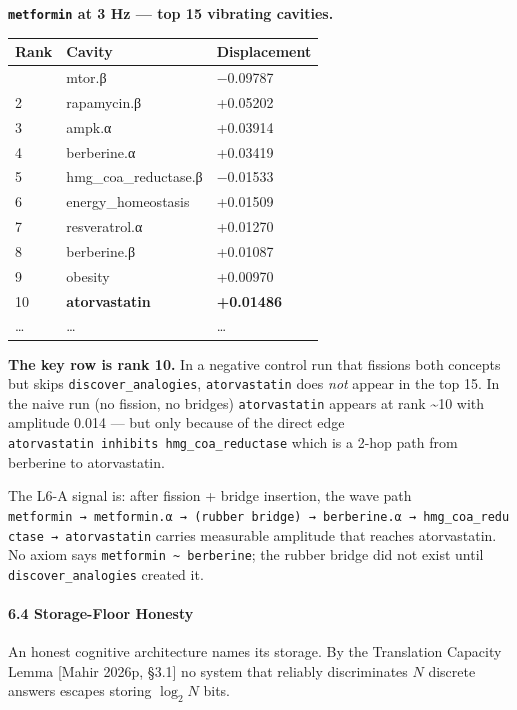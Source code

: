 \documentclass[
  11pt,
  a4paper,
]{article}
\begin{document}
\textbf{\texttt{metformin} at 3 Hz --- top 15 vibrating cavities.}

\begin{longtable}[]{@{}lll@{}}
\toprule\noalign{}
Rank & Cavity & Displacement \\
\midrule\noalign{}
\endhead
\bottomrule\noalign{}
\endlastfoot
1 & mtor.β & −0.09787 \\
2 & rapamycin.β & +0.05202 \\
3 & ampk.α & +0.03914 \\
4 & berberine.α & +0.03419 \\
5 & hmg\_coa\_reductase.β & −0.01533 \\
6 & energy\_homeostasis & +0.01509 \\
7 & resveratrol.α & +0.01270 \\
8 & berberine.β & +0.01087 \\
9 & obesity & +0.00970 \\
10 & \textbf{atorvastatin} & \textbf{+0.01486} \\
\ldots{} & \ldots{} & \ldots{} \\
\end{longtable}

\textbf{The key row is rank 10.} In a negative control run that fissions
both concepts but skips \texttt{discover\_analogies},
\texttt{atorvastatin} does \emph{not} appear in the top 15. In the naive
run (no fission, no bridges) \texttt{atorvastatin} appears at rank
\textasciitilde10 with amplitude 0.014 --- but only because of the
direct edge \texttt{atorvastatin\ inhibits\ hmg\_coa\_reductase} which
is a 2-hop path from berberine to atorvastatin.

The L6-A signal is: after fission + bridge insertion, the wave path
\texttt{metformin\ →\ metformin.α\ →\ (rubber\ bridge)\ →\ berberine.α\ →\ hmg\_coa\_reductase\ →\ atorvastatin}
carries measurable amplitude that reaches atorvastatin. No axiom says
\texttt{metformin\ \textasciitilde{}\ berberine}; the rubber bridge did
not exist until \texttt{discover\_analogies} created it.

\paragraph{6.4 Storage-Floor Honesty}\label{storage-floor-honesty}

An honest cognitive architecture names its storage. By the Translation
Capacity Lemma {[}Mahir 2026p, §3.1{]} no system that reliably
discriminates \(N\) discrete answers escapes storing \(\log_2 N\) bits.
\end{document}
